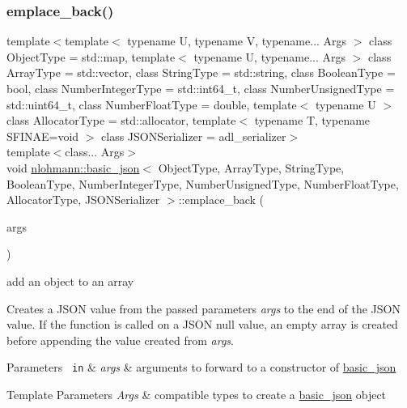 \subsubsection{\texorpdfstring{emplace\_back()}{emplace\_back()}}
{\footnotesize\ttfamily template$<$template$<$ typename U, typename V, typename... Args $>$ class Object\+Type = std\+::map, template$<$ typename U, typename... Args $>$ class Array\+Type = std\+::vector, class String\+Type  = std\+::string, class Boolean\+Type  = bool, class Number\+Integer\+Type  = std\+::int64\+\_\+t, class Number\+Unsigned\+Type  = std\+::uint64\+\_\+t, class Number\+Float\+Type  = double, template$<$ typename U $>$ class Allocator\+Type = std\+::allocator, template$<$ typename T, typename S\+F\+I\+N\+A\+E=void $>$ class J\+S\+O\+N\+Serializer = adl\+\_\+serializer$>$ \\
template$<$class... Args$>$ \\
void \mbox{\hyperlink{classnlohmann_1_1basic__json}{nlohmann\+::basic\+\_\+json}}$<$ Object\+Type, Array\+Type, String\+Type, Boolean\+Type, Number\+Integer\+Type, Number\+Unsigned\+Type, Number\+Float\+Type, Allocator\+Type, J\+S\+O\+N\+Serializer $>$\+::emplace\+\_\+back (\begin{DoxyParamCaption}\item[{Args \&\&...}]{args }\end{DoxyParamCaption})\hspace{0.3cm}{\ttfamily [inline]}}



add an object to an array 

Creates a J\+S\+ON value from the passed parameters {\itshape args} to the end of the J\+S\+ON value. If the function is called on a J\+S\+ON null value, an empty array is created before appending the value created from {\itshape args}.


\begin{DoxyParams}[1]{Parameters}
\mbox{\texttt{ in}}  & {\em args} & arguments to forward to a constructor of \mbox{\hyperlink{classnlohmann_1_1basic__json}{basic\+\_\+json}} \\
\hline
\end{DoxyParams}

\begin{DoxyTemplParams}{Template Parameters}
{\em Args} & compatible types to create a \mbox{\hyperlink{classnlohmann_1_1basic__json}{basic\+\_\+json}} object\\
\hline
\end{DoxyTemplParams}

